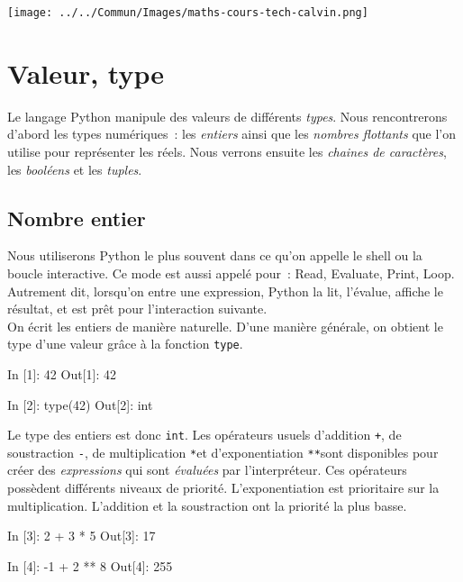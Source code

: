 \documentclass{magnoliaold}
\begin{document}
\hfill\texttt{[image: ../../Commun/Images/maths-cours-tech-calvin.png]}\\

\magtoc

\section{Valeur, type}

Le langage Python manipule des valeurs de différents \emph{types}.
Nous rencontrerons d'abord les types numériques~: les \emph{entiers} ainsi que les
\emph{nombres flottants} que l'on utilise pour représenter les réels. Nous verrons
ensuite les \emph{chaines de caractères}, les \emph{booléens} et les \emph{tuples}.

\subsection{Nombre entier}

Nous utiliserons Python le plus souvent dans ce qu'on
appelle le shell ou la boucle interactive. Ce mode est aussi appelé
 \fg pour~: Read, Evaluate, Print, Loop. Autrement dit, lorsqu'on entre
une expression, Python la lit, l'évalue, affiche le résultat, et est
prêt pour l'interaction suivante.\\

On écrit les entiers de manière naturelle. D'une manière générale,
on obtient le type d'une valeur grâce à la fonction \verb_type_. 

\begin{pythoncode}
In [1]: 42
Out[1]: 42

In [2]: type(42)
Out[2]: int
\end{pythoncode}

\noindent Le type des entiers est donc \verb_int_. 
Les opérateurs usuels d'addition \og\verb_+_\fg, de soustraction \og\verb_-_\fg, de
multiplication \og\verb+*+\fg et d'exponentiation \og\verb_**_\fg sont disponibles pour
créer des \emph{expressions} qui sont \emph{évaluées} par l'interpréteur. Ces opérateurs
possèdent différents niveaux de priorité. L'exponentiation est prioritaire sur 
la multiplication. L'addition et la soustraction ont la priorité la plus basse.

\begin{pythoncode}
In [3]: 2 + 3 * 5
Out[3]: 17

In [4]: -1 + 2 ** 8
Out[4]: 255
\end{pythoncode}
\end{document}
